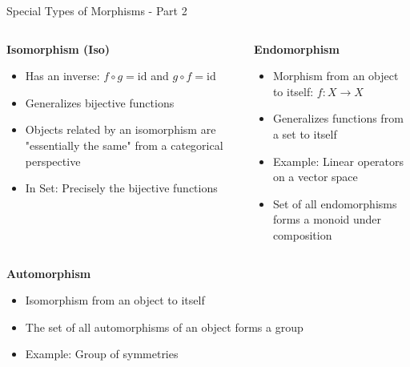 \documentclass{beamer}
\begin{document}
\begin{frame}{Special Types of Morphisms - Part 2}
    \begin{columns}
        \begin{column}{0.5\textwidth}
            \textbf{Isomorphism (Iso)}
            \begin{itemize}
                \item Has an inverse: $f \circ g = \text{id}$ and $g \circ f = \text{id}$
                \item Generalizes bijective functions
                \item Objects related by an isomorphism are "essentially the same" from a categorical perspective
                \item In Set: Precisely the bijective functions
            \end{itemize}
        \end{column}
        \begin{column}{0.5\textwidth}
            \textbf{Endomorphism}
            \begin{itemize}
                \item Morphism from an object to itself: $f: X \to X$
                \item Generalizes functions from a set to itself
                \item Example: Linear operators on a vector space
                \item Set of all endomorphisms forms a monoid under composition
            \end{itemize}
        \end{column}
    \end{columns}
    
    \vspace{0.3cm}
    \textbf{Automorphism}
    \begin{itemize}
        \item Isomorphism from an object to itself
        \item The set of all automorphisms of an object forms a group
        \item Example: Group of symmetries
    \end{itemize}
\end{frame}
\end{document}
